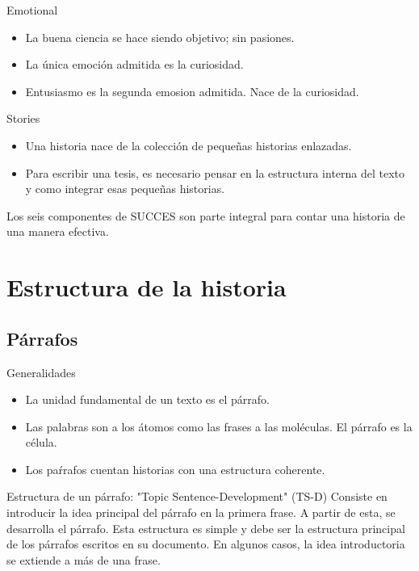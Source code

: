 \documentclass[
10pt,
aspectratio=169,
]{beamer}
\begin{document}
\begin{frame}[c]{\alert{E}motional}
\begin{itemize}
\item La buena ciencia se hace siendo objetivo; sin pasiones.
\item La \'unica \alert{emoci\'on} admitida es la \alert{curiosidad}.
\item \alert{Entusiasmo} es la segunda \alert{emosion} admitida. Nace de la curiosidad.
\end{itemize}
\end{frame}

\begin{frame}[c]{\alert{S}tories}
\begin{itemize}
\item \alert{Una historia nace de la colecci\'on de peque\~nas historias enlazadas.}
\item Para escribir una tesis, es necesario pensar en la estructura interna del texto y como integrar esas peque\~nas historias.
\end{itemize}
Los seis componentes de \alert{SUCCES} son parte integral para contar una historia de una manera efectiva.
\end{frame}


\section{Estructura de la historia}
\subsection{P\'arrafos}
\begin{frame}[c]{Generalidades}
\begin{itemize}
\item La unidad fundamental de un texto es el \alert{p\'arrafo}.
\item Las palabras son a los \'atomos como las frases a las mol\'eculas. El p\'arrafo es la c\'elula. 
\item Los pa\'rrafos cuentan historias con una estructura coherente.
\end{itemize}
\end{frame}

\begin{frame}[c]{Estructura de un p\'arrafo: \alert{"Topic Sentence-Development" (TS-D)}}
Consiste en introducir la idea principal del p\'arrafo en la primera frase. A partir de esta, se desarrolla el p\'arrafo. Esta estructura es simple y debe ser la estructura principal de los p\'arrafos escritos en su documento. En algunos casos, la idea introductoria se extiende a m\'as de una frase. 
\end{frame}
\end{document}
